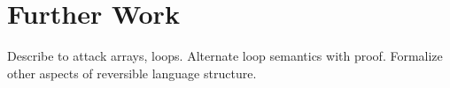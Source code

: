 \chapter{Further Work}
Describe to attack arrays, loops. Alternate loop semantics with
proof. Formalize other aspects of reversible language structure. 

